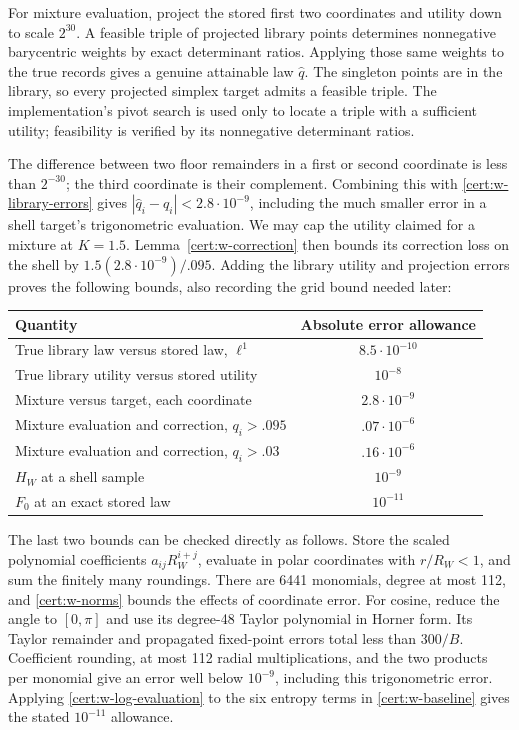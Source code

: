 \documentclass[11pt]{article}
\numberwithin{equation}{section}
\theoremstyle{definition}
\theoremstyle{remark}
\begin{document}
For mixture evaluation, project the stored first two coordinates and
utility down to scale $2^{30}$.  A feasible triple of projected library
points determines nonnegative barycentric weights by exact determinant
ratios.  Applying those same weights to the true records gives a genuine
attainable law $\widehat q$.  The singleton points are in the library,
so every projected simplex target admits a feasible triple.  The
implementation's pivot search is used only to locate a triple with a
sufficient utility; feasibility is verified by its nonnegative determinant
ratios.

The difference between two floor remainders in a first or second
coordinate is less than $2^{-30}$; the third coordinate is their
complement.  Combining this with \eqref{cert:w-library-errors} gives
$|\widehat q_i-q_i|<2.8\cdot10^{-9}$, including the much smaller
error in a shell target's trigonometric evaluation.  We may cap the
utility claimed for a mixture at $K=1.5$.  Lemma~\ref{cert:w-correction}
then bounds its correction loss on the shell by
$1.5(2.8\cdot10^{-9})/.095$.  Adding the library utility and projection
errors proves the following bounds, also recording the grid bound needed
later:
\begin{center}
\begin{tabular}{@{}lc@{}}
\toprule
Quantity & Absolute error allowance\\
\midrule
True library law versus stored law, $\ell^1$ & $8.5\cdot10^{-10}$\\
True library utility versus stored utility & $10^{-8}$\\
Mixture versus target, each coordinate & $2.8\cdot10^{-9}$\\
Mixture evaluation and correction, $q_i>.095$ & $.07\cdot10^{-6}$\\
Mixture evaluation and correction, $q_i>.03$ & $.16\cdot10^{-6}$\\
$H_W$ at a shell sample & $10^{-9}$\\
$F_0$ at an exact stored law & $10^{-11}$\\
\bottomrule
\end{tabular}
\end{center}
The last two bounds can be checked directly as follows.  Store the
scaled polynomial coefficients $a_{ij}R_W^{i+j}$, evaluate in polar
coordinates with $r/R_W<1$, and sum the finitely many roundings.
There are 6441 monomials, degree at most 112, and
\eqref{cert:w-norms} bounds the effects of coordinate error.
For cosine, reduce the angle to $[0,\pi]$ and use its degree-48 Taylor
polynomial in Horner form.  Its Taylor remainder and propagated
fixed-point errors total less than $300/B$.  Coefficient rounding,
at most 112 radial multiplications, and the two products per monomial
give an error well below $10^{-9}$, including this trigonometric
error.  Applying \eqref{cert:w-log-evaluation} to the six entropy terms
in \eqref{cert:w-baseline} gives the stated $10^{-11}$ allowance.
\end{document}
